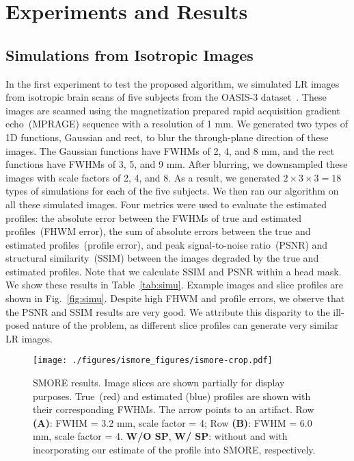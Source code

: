 \documentclass[runningheads]{llncs}
\begin{document}
\section{Experiments and Results}

\subsection{Simulations from Isotropic Images}

In the first experiment to test the proposed algorithm, we simulated
LR images from isotropic brain scans of five subjects from the OASIS-3
dataset~\cite{lamontagne-2019-oasis3}. These images are scanned using
the magnetization prepared rapid acquisition gradient echo~(MPRAGE)
sequence with a resolution of 1 mm. We generated two types of 1D
functions, Gaussian and rect, to blur the through-plane direction of
these images. The Gaussian functions have FWHMs of 2, 4, and 8 mm, and
the rect functions have FWHMs of 3, 5, and 9 mm. After blurring, we
downsampled these images with scale factors of 2, 4, and 8. As a
result, we generated $2 \times 3 \times 3 = 18$ types of simulations
for each of the five
subjects. We then ran our algorithm on all these simulated images.
Four metrics were used to evaluate the estimated profiles: the
absolute error between the FWHMs of true and estimated profiles~(FHWM error),
the sum of absolute errors between the true and estimated
profiles~(profile error),
and peak signal-to-noise ratio~(PSNR) and structural
similarity~(SSIM) between the images degraded by the true and
estimated profiles. Note that we calculate SSIM and PSNR within a head
mask. We show these results
in Table~\ref{tab:simu}.  Example images and slice
profiles are shown in Fig.~\ref{fig:simu}.  Despite high FHWM and profile errors,
we observe that the PSNR and SSIM results are very good. We
attribute this disparity to the ill-posed nature of the problem, as
different slice profiles can generate very similar LR images.
%
\begin{figure}[t]
    \centering
    \texttt{[image: ./figures/ismore\_figures/ismore-crop.pdf]}
    \caption{SMORE results. Image slices are shown partially for
    display purposes. True~(red) and estimated (blue) profiles are
    shown with their corresponding FWHMs. The arrow points to an
    artifact. Row \textbf{(A)}: FWHM = 3.2 mm, scale factor = 4; Row
    \textbf{(B)}: FWHM = 6.0 mm, scale factor = 4. \textbf{W/O SP},
    \textbf{W/ SP}: without and with incorporating our estimate
    of the profile into SMORE, respectively.}
    \label{fig:smore}
\end{figure}
\end{document}
